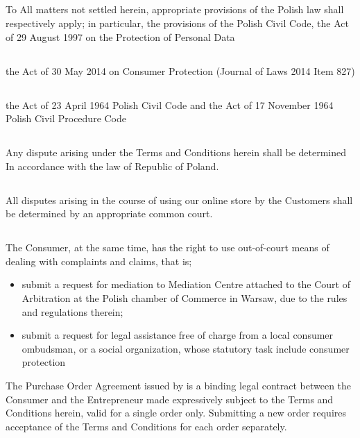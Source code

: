 
		\subsection{} To All matters not settled herein, appropriate provisions of the Polish law shall respectively apply; in particular, the provisions of the Polish Civil Code, the Act of 29 August 1997 on the Protection of Personal Data 
\subsection{} the Act of 30 May 2014 on Consumer Protection (Journal of Laws 2014 Item 827)
\subsection{} the Act of 23 April 1964 Polish Civil Code and the Act of 17 November 1964 Polish Civil Procedure Code 
\subsection{} Any dispute arising under the Terms and Conditions herein shall be determined In accordance with the law of Republic of Poland.
\subsection{} All disputes arising in the course of using our online store \shopname by the Customers shall be determined by an appropriate common court.
\subsection{} The Consumer, at the same time, has the right to use out-of-court means of dealing with complaints and claims, that is;
\begin{itemize}
\item submit a request for mediation to Mediation Centre attached to the Court of Arbitration at the Polish chamber of Commerce in Warsaw, due to the rules and regulations therein; 
\item submit a request for legal assistance free of charge from a local consumer ombudsman, or a social organization, whose statutory task include consumer protection
\end{itemize}
The Purchase Order Agreement issued by \shopname is a binding legal contract between the Consumer and the Entrepreneur made expressively subject to the Terms and Conditions herein, valid for a single order only. Submitting a new order requires acceptance of the Terms and Conditions for each order separately.
	 
